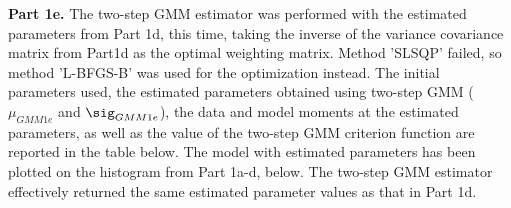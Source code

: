 \documentclass[letterpaper,12pt]{article}
\theoremstyle{definition}
\begin{document}
\noindent\newline\textbf{Part 1e.} The two-step GMM estimator was performed with the estimated parameters from Part 1d, this time, taking the inverse of the variance covariance matrix from Part1d as the optimal weighting matrix.  Method 'SLSQP' failed, so method 'L-BFGS-B' was used for the optimization instead. The initial parameters used, the estimated parameters obtained using two-step GMM ($\mu_{GMM1e}$ and $\sig_{GMM1e}$), the data and model moments at the estimated parameters, as well as the value of the two-step GMM criterion function are reported in the table below. The model with estimated parameters has been plotted on the histogram from Part 1a-d, below. The two-step GMM estimator effectively returned the same estimated parameter values as that in Part 1d.

\begin{center}
\end{center}
\end{document}
